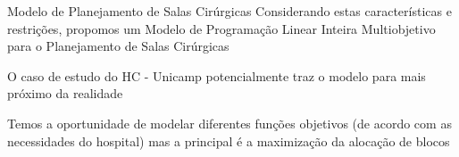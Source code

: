 \documentclass[10pt]{beamer}
\newcommand{\ca}[1]{\textcolor{cr}{#1}}
\begin{document}

\begin{frame}{Modelo de Planejamento de Salas Cirúrgicas}
    Considerando estas características e restrições, propomos um \ca{Modelo de Programação Linear Inteira Multiobjetivo para o Planejamento de Salas Cirúrgicas}
    \vspace{2em}

    O caso de estudo do HC - Unicamp potencialmente traz o modelo para mais próximo da realidade
    \vspace{2em}

    Temos a oportunidade de modelar diferentes funções objetivos (de acordo com as necessidades do hospital) mas a principal é a \ca{maximização da alocação de blocos}
\end{frame}
\end{document}
